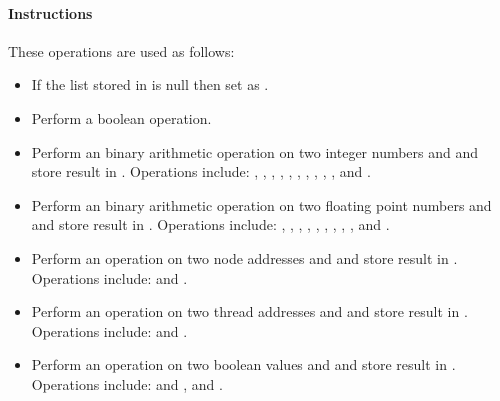 \paragraph{Instructions}

These operations are used as follows:

\begin{itemize}
   \item {}

   If the list stored in  is null then set  as .

   \item {}

   Perform a boolean  operation.

   \item {}

   Perform an binary arithmetic operation on two integer numbers  and
    and store result in . Operations include: \code{+},
   \code{-}, \code{*}, \code{/}, \code{\%}, \code{=}, \code{<>}, \code{<}, \code{<=},
   \code{>=}, and \code{>}.

   \item {}

   Perform an binary arithmetic operation on two floating point numbers  and
    and store result in . Operations include: \code{+},
   \code{-}, \code{*}, \code{/}, \code{=}, \code{<>}, \code{<}, \code{<=},
   \code{>=}, and \code{>}.

   \item {}

   Perform an operation on two node addresses  and
    and store result in . Operations include: \code{=} and
   \code{<>}.

   \item {}

   Perform an operation on two thread addresses  and
    and store result in . Operations include: \code{=} and
   \code{<>}.

   \item \code{[bool op [op1 : register, op2 : register, dest : register]}

   Perform an operation on two boolean values  and
    and store result in . Operations include: \code{=} and
   \code{<>},  and .

\end{itemize}

